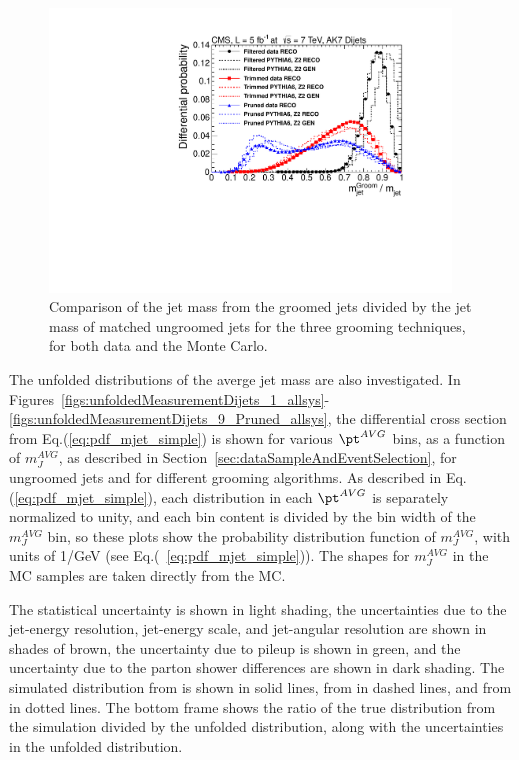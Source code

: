 \begin{figure}[htbp]
\centering
\includegraphics[width=0.95\textwidth]{figs/histAK7PtAvgVsMjetGroomOverReco_ratioPlots}
\caption{Comparison of the jet mass from the groomed jets
divided by the jet mass of matched ungroomed jets for the
three grooming techniques, for both data and the \PYTHIA Monte Carlo. 
\label{figs:histAK7PtAvgVsMjetGroomOverReco_ratioPlots}}
\end{figure}

\fi


\label{sec:results}

\ifnpas
The unfolded distributions of the 
averge jet mass are also investigated.
In Figures~\ref{figs:unfoldedMeasurementDijets_1_allsys}-
\ref{figs:unfoldedMeasurementDijets_9_Pruned_allsys}, 
the differential cross
section from Eq.(\ref{eq:pdf_mjet_simple}) is shown for
various $\pt^{AVG}$ bins, as a function of
$m_{J}^{AVG}$, as described in
Section~\ref{sec:dataSampleAndEventSelection}, 
for ungroomed jets and for different grooming algorithms. 
As described in Eq.(\ref{eq:pdf_mjet_simple}),
each distribution in each $\pt^{AVG}$ is separately normalized to
unity, and each bin content is divided by the bin width of the
$m_J^{AVG}$ bin,
so these plots show the probability distribution function of $m_J^{AVG}$,
with units of 1/GeV (see Eq.(~\ref{eq:pdf_mjet_simple})). 
The shapes for $m_J^{AVG}$ in the MC samples are
taken directly from the MC.


The statistical uncertainty is shown in light shading, the uncertainties due to the jet-energy resolution, jet-energy scale, and jet-angular resolution are shown in shades of brown, the uncertainty due to pileup is shown in green, and the uncertainty due to the parton shower differences are shown in dark shading.
The simulated distribution from \PYTHIA is shown in solid lines, 
from \PYTHIAEIGHT in dashed lines, and from \HERWIG in dotted lines. 
The bottom frame shows the ratio of the true distribution from
the simulation divided by the unfolded distribution, along with
the uncertainties in the unfolded distribution. 


